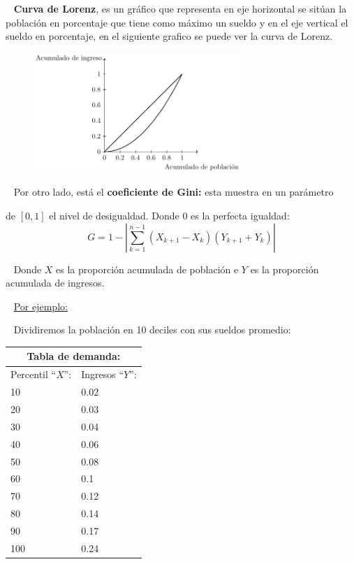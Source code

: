 \documentclass[
  letterpaper,
  DIV=11,
  numbers=noendperiod]{scrreport}
\begin{document}
~ \textbf{Curva de Lorenz}, es un gráfico que representa en eje
horizontal se sitúan la población en porcentaje que tiene como máximo un
sueldo y en el eje vertical el sueldo en porcentaje, en el siguiente
grafico se puede ver la curva de Lorenz.

\begin{figure}

{\centering \includegraphics[width=0.7\textwidth,height=\textheight]{4sistimpo_files/figure-pdf/unnamed-chunk-5-1.pdf}

}

\end{figure}

~ Por otro lado, está el \textbf{coeficiente de Gini:} esta muestra en
un parámetro

de \([0,1]\) el nivel de desigualdad. Donde 0 es la perfecta igualdad:
\[
G=1-\left|\sum_{k=1}^{n-1}\left(X_{k+1}-X_k\right)\left(Y_{k+1}+Y_k\right)\right| 
\]

~ Donde \(X\) es la proporción acumulada de población e \(Y\) es la
proporción acumulada de ingresos.

~ \ul{Por ejemplo:}

~ Dividiremos la población en 10 deciles con sus sueldos promedio:

\begin{table}[H]
    \centering
    \begin{tabular}{|p{25mm}|p{25mm}|}
        \multicolumn{2}{c}{Tabla de demanda:} \\
        \hline
        Percentil “$X$”: & Ingresos “$Y$”: \\ \hline
        10 & 0.02 \\ \hline
        20 & 0.03 \\ \hline
        30 & 0.04 \\ \hline
        40 & 0.06 \\ \hline
        50 & 0.08 \\ \hline
        60 & 0.1 \\ \hline
        70 & 0.12 \\ \hline
        80 & 0.14 \\ \hline
        90 & 0.17 \\ \hline
        100 & 0.24 \\ \hline
        \end{tabular}
\end{table}
\end{document}

